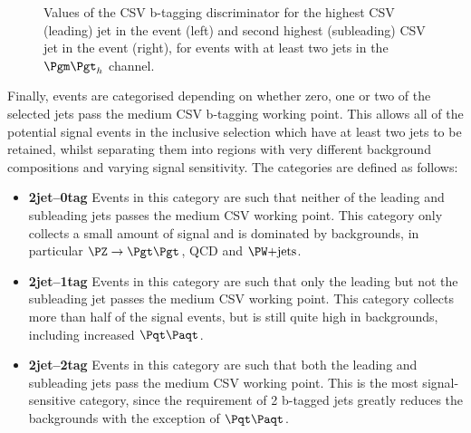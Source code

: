 \begin{figure}
\begin{center}

\end{center}
\caption{
Values of the \ac{CSV} b-tagging discriminator for the highest \ac{CSV}
(leading) jet in the event (left) and second highest (subleading) \ac{CSV} jet
in the event (right), for events with at least two jets in the $\mutau$ channel.}
\label{fig:Hhhcsv}
\end{figure} 

Finally, events are categorised depending on whether zero, one or two of the selected jets pass the
medium \ac{CSV} b-tagging working point. This allows all of the potential signal
events in the inclusive selection which have at least two jets to be retained,
whilst separating them into regions with very different background compositions
and varying signal sensitivity. The categories are defined as follows:

\begin{itemize}
\item \textbf{2jet--0tag} 
Events in this category are such that neither of the leading and subleading jets
passes the medium \ac{CSV} working point. This category only collects a small amount
of signal and is dominated by backgrounds, in particular $\ZToTauTau$, QCD and
$\WJets$.
\item \textbf{2jet--1tag} 
Events in this category are such that only the leading but not the subleading jet
passes the medium \ac{CSV} working point. This category collects more than half of
the signal events, but is still quite high in backgrounds, including increased
$\ttbar$.
\item \textbf{2jet--2tag} 
Events in this category are such that both the leading and subleading jets
pass the medium \ac{CSV} working point. This is the most signal-sensitive category,
since the requirement of 2 b-tagged jets greatly reduces the backgrounds with
the exception of $\ttbar$.  
\end{itemize}

